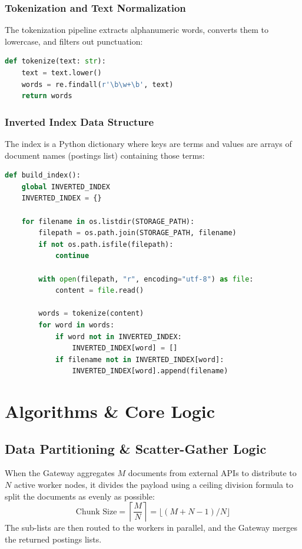 \documentclass[11pt,a4paper]{article}
\begin{document}
\subsubsection{Tokenization and Text Normalization}
The tokenization pipeline extracts alphanumeric words, converts them to lowercase, and filters out punctuation:
\begin{lstlisting}[language=Python]
def tokenize(text: str):
    text = text.lower()
    words = re.findall(r'\b\w+\b', text)
    return words
\end{lstlisting}

\subsubsection{Inverted Index Data Structure}
The index is a Python dictionary where keys are terms and values are arrays of document names (postings list) containing those terms:
\begin{lstlisting}[language=Python]
def build_index():
    global INVERTED_INDEX
    INVERTED_INDEX = {}

    for filename in os.listdir(STORAGE_PATH):
        filepath = os.path.join(STORAGE_PATH, filename)
        if not os.path.isfile(filepath):
            continue

        with open(filepath, "r", encoding="utf-8") as file:
            content = file.read()

        words = tokenize(content)
        for word in words:
            if word not in INVERTED_INDEX:
                INVERTED_INDEX[word] = []
            if filename not in INVERTED_INDEX[word]:
                INVERTED_INDEX[word].append(filename)
\end{lstlisting}

\newpage

\section{Algorithms \& Core Logic}

\subsection{Data Partitioning & Scatter-Gather Logic}
When the Gateway aggregates $M$ documents from external APIs to distribute to $N$ active worker nodes, it divides the payload using a ceiling division formula to split the documents as evenly as possible:
\begin{equation}
\text{Chunk Size} = \left\lceil \frac{M}{N} \right\rceil = \lfloor(M + N - 1) / N\rfloor
\end{equation}
The sub-lists are then routed to the workers in parallel, and the Gateway merges the returned postings lists.
\end{document}
